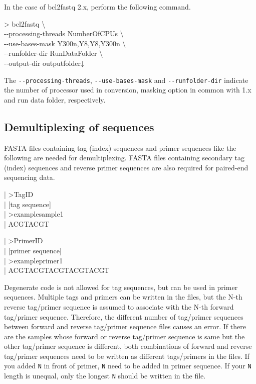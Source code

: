 \documentclass[titlepage,10pt,a4paper,english]{jsbook}
\newenvironment{content}{\begin{shaded}\vspace{-1em}\raggedright\ttfamily\footnotesize\setlength{\baselineskip}{1.4em}}{\end{shaded}\vspace{-1em}}
\newenvironment{cmd}{\begin{oframed}\raggedright\ttfamily\footnotesize\setlength{\baselineskip}{1.4em}}{\end{oframed}\vspace{-1em}}
\begin{document}
In the case of bcl2fastq 2.x, perform the following command.

\begin{cmd}
{\textgreater} bcl2fastq {\textbackslash}\\
{-}{-}processing-threads NumberOfCPUs {\textbackslash}\\
{-}{-}use-bases-mask Y300n,Y8,Y8,Y300n {\textbackslash}\\
{-}{-}runfolder-dir RunDataFolder {\textbackslash}\\
{-}{-}output-dir outputfolder↓
\end{cmd}

The \texttt{{-}{-}processing-threads}, \texttt{{-}{-}use-bases-mask} and \texttt{{-}{-}runfolder-dir} indicate the number of processor used in conversion, masking option in common with 1.x and run data folder, respectively.

\subsection{Demultiplexing of sequences}

FASTA files containing tag (index) sequences and primer sequences like the following are needed for demultiplexing.
FASTA files containing secondary tag (index) sequences and reverse primer sequences are also required for paired-end sequencing data.

\begin{content}
| {\textgreater}TagID\\
| [tag sequence]\\
| {\textgreater}examplesample1\\
| ACGTACGT
\end{content}

\begin{content}
| {\textgreater}PrimerID\\
| [primer sequence]\\
| {\textgreater}exampleprimer1\\
| ACGTACGTACGTACGTACGT
\end{content}

Degenerate code is not allowed for tag sequences, but can be used in primer sequences.
Multiple tags and primers can be written in the files, but the N-th reverse tag/primer sequence is assumed to associate with the N-th forward tag/primer sequence.
Therefore, the different number of tag/primer sequences between forward and reverse tag/primer sequence files causes an error.
If there are the samples whose forward or reverse tag/primer sequence is same but the other tag/primer sequence is different, both combinations of forward and reverse tag/primer sequences need to be written as different tags/primers in the files.
If you added \texttt{N} in front of primer, \texttt{N} need to be added in primer sequence.
If your \texttt{N} length is unequal, only the longest \texttt{N} should be written in the file.
\end{document}
